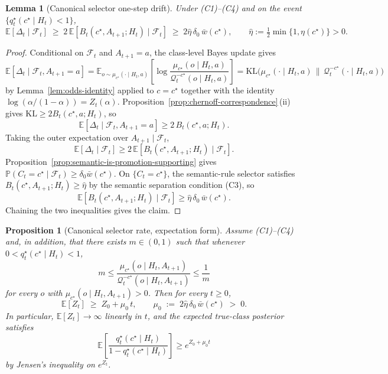 \documentclass[11pt]{article}
\newtheorem{proposition}[theorem]{Proposition}
\newtheorem{lemma}[theorem]{Lemma}
\theoremstyle{definition}
\theoremstyle{remark}
\newcommand{\Qcal}{\mathcal{Q}}
\newcommand{\E}{\mathbb{E}}
\newcommand{\Prob}{\mathbb{P}}
\newcommand{\KL}{\mathrm{KL}}
\begin{document}
\begin{lemma}[Canonical selector one-step drift]
\label{lem:one-step-drift}
Under \textup{(C1)--(C4)} and on the event $\{q_t^\star(c^\star\mid H_t)<1\}$,
\[
\E[\Delta_t\mid\mathcal F_t]
\;\ge\;
2\,\E[B_t(c^\star,A_{t+1};H_t)\mid\mathcal F_t]
\;\ge\;
2\hat\eta\,\delta_0\,\bar w(c^\star),
\qquad
\hat\eta:=\tfrac{1}{2}\min\{1,\eta(c^\star)\}>0.
\]
\end{lemma}

\begin{proof}
Conditional on $\mathcal F_t$ and $A_{t+1}=a$, the class-level Bayes update gives
\[
\E[\Delta_t\mid\mathcal F_t,A_{t+1}=a]
=
\E_{o\sim\mu_{c^\star}(\cdot\mid H_t,a)}\!\left[
\log\frac{\mu_{c^\star}(o\mid H_t,a)}{\Qcal_t^{-c^\star}(o\mid H_t,a)}
\right]
=\KL\!\bigl(\mu_{c^\star}(\cdot\mid H_t,a)\,\|\,\Qcal_t^{-c^\star}(\cdot\mid H_t,a)\bigr)
\]
by Lemma~\ref{lem:odds-identity} applied to $c=c^\star$ together with the identity $\log(\alpha/(1-\alpha))=Z_t(\alpha)$. Proposition~\ref{prop:chernoff-correspondence}\,(ii) gives $\KL\ge 2B_t(c^\star,a;H_t)$, so
\[
\E[\Delta_t\mid\mathcal F_t,A_{t+1}=a]\ge 2\,B_t(c^\star,a;H_t).
\]
Taking the outer expectation over $A_{t+1}\mid\mathcal F_t$,
\[
\E[\Delta_t\mid\mathcal F_t]\ge 2\,\E[B_t(c^\star,A_{t+1};H_t)\mid\mathcal F_t].
\]
Proposition~\ref{prop:semantic-is-promotion-supporting} gives $\Prob(C_t=c^\star\mid\mathcal F_t)\ge\delta_0\bar w(c^\star)$. On $\{C_t=c^\star\}$, the semantic-rule selector satisfies $B_t(c^\star,A_{t+1};H_t)\ge\hat\eta$ by the semantic separation condition (C3), so
\[
\E[B_t(c^\star,A_{t+1};H_t)\mid\mathcal F_t]\ge\hat\eta\,\delta_0\,\bar w(c^\star).
\]
Chaining the two inequalities gives the claim.
\end{proof}

\begin{proposition}[Canonical selector rate, expectation form]
\label{prop:exp-rate}
Assume \textup{(C1)--(C4)} and, in addition, that there exists $m\in(0,1)$ such that whenever $0<q_t^\star(c^\star\mid H_t)<1$,
\[
m\le
\frac{\mu_{c^\star}(o\mid H_t,A_{t+1})}{\Qcal_t^{-c^\star}(o\mid H_t,A_{t+1})}
\le \frac{1}{m}
\]
for every $o$ with $\mu_{c^\star}(o\mid H_t,A_{t+1})>0$. Then for every $t\ge 0$,
\[
\E[Z_t]\;\ge\;Z_0+\mu_0\,t,
\qquad
\mu_0\;:=\;2\hat\eta\,\delta_0\,\bar w(c^\star)\;>\;0.
\]
In particular, $\E[Z_t]\to\infty$ linearly in $t$, and the expected true-class posterior satisfies
\[
\E\!\left[\frac{q_t^\star(c^\star\mid H_t)}{1-q_t^\star(c^\star\mid H_t)}\right]\ge e^{Z_0+\mu_0 t}
\]
by Jensen's inequality on $e^{Z_t}$.
\end{proposition}
\end{document}

